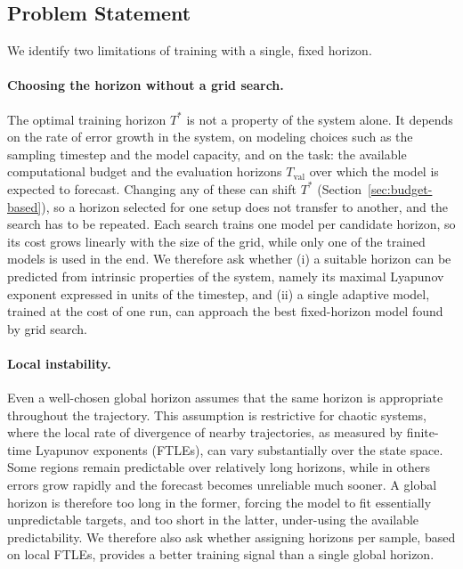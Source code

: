 \documentclass{article}
\begin{document}
\subsection{Problem Statement}

We identify two limitations of training with a single, fixed horizon.

\paragraph{Choosing the horizon without a grid search.}
The optimal training horizon $T^*$ is not a property of the system alone. It depends on the rate of error growth in the system, on modeling choices such as the sampling timestep and the model capacity, and on the task: the available computational budget and the evaluation horizons $T_{\mathrm{val}}$ over which the model is expected to forecast. Changing any of these can shift $T^*$ (Section~\ref{sec:budget-based}), so a horizon selected for one setup does not transfer to another, and the search has to be repeated. Each search trains one model per candidate horizon, so its cost grows linearly with the size of the grid, while only one of the trained models is used in the end. We therefore ask whether (i) a suitable horizon can be predicted from intrinsic properties of the system, namely its maximal Lyapunov exponent expressed in units of the timestep, and (ii) a single adaptive model, trained at the cost of one run, can approach the best fixed-horizon model found by grid search.

\paragraph{Local instability.}
Even a well-chosen global horizon assumes that the same horizon is appropriate throughout the trajectory. This assumption is restrictive for chaotic systems, where the local rate of divergence of nearby trajectories, as measured by finite-time Lyapunov exponents (FTLEs), can vary substantially over the state space. Some regions remain predictable over relatively long horizons, while in others errors grow rapidly and the forecast becomes unreliable much sooner. A global horizon is therefore too long in the former, forcing the model to fit essentially unpredictable targets, and too short in the latter, under-using the available predictability. We therefore also ask whether assigning horizons per sample, based on local FTLEs, provides a better training signal than a single global horizon.
\end{document}
